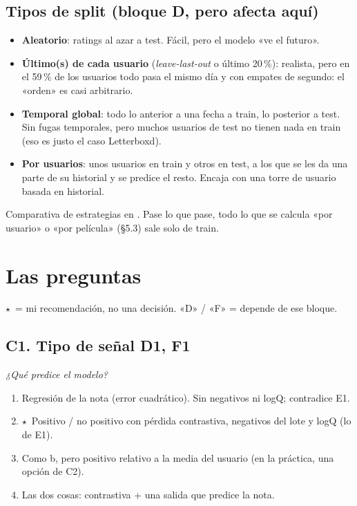 \documentclass[a4paper,11pt]{article}
\newcommand{\rec}{\ensuremath{\star}}
\begin{document}
\subsection{Tipos de split (bloque D, pero afecta aquí)}
\begin{itemize}
  \item \textbf{Aleatorio}: ratings al azar a test. Fácil, pero el modelo «ve el futuro».
  \item \textbf{Último(s) de cada usuario} (\emph{leave-last-out} o último 20\,\%): realista, pero en el 59\,\% de los
        usuarios todo pasa el mismo día y con empates de segundo: el «orden» es casi arbitrario.
  \item \textbf{Temporal global}: todo lo anterior a una fecha a train, lo posterior a test. Sin fugas temporales, pero
        muchos usuarios de test no tienen nada en train (eso es justo el caso Letterboxd).
  \item \textbf{Por usuarios}: unos usuarios en train y otros en test, a los que se les da una parte de su historial y
        se predice el resto. Encaja con una torre de usuario basada en historial.
\end{itemize}
Comparativa de estrategias en \cite{meng2020}. Pase lo que pase, todo lo que se calcula «por usuario» o «por película»
(\S5.3) sale solo de train.

\section{Las preguntas}
\rec\ = mi recomendación, no una decisión. «D» / «F» = depende de ese bloque.

\newcommand{\preg}[3]{\subsection*{#1 \normalfont\small\hfill #3}\textit{#2}\par}

\preg{C1. Tipo de señal}{¿Qué predice el modelo?}{D1, F1}
\begin{enumerate}[label=\alph*)]
  \item Regresión de la nota (error cuadrático). Sin negativos ni logQ; contradice E1.
  \item \rec\ Positivo / no positivo con pérdida contrastiva, negativos del lote y logQ (lo de E1).
  \item Como b, pero positivo relativo a la media del usuario (en la práctica, una opción de C2).
  \item Las dos cosas: contrastiva + una salida que predice la nota.
\end{enumerate}
\end{document}
